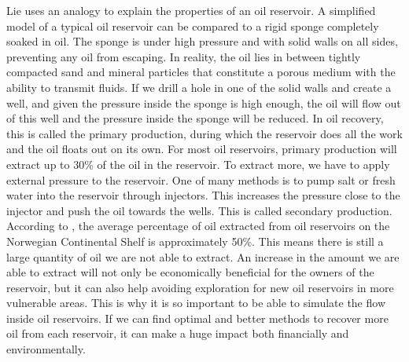 Lie uses an analogy to explain the properties of an oil reservoir. A simplified model of a typical oil reservoir can be compared to a rigid sponge completely soaked in oil. The sponge is under high pressure and with solid walls on all sides, preventing any oil from escaping. In reality, the oil lies in between tightly compacted sand and mineral particles that constitute a porous medium with the ability to transmit fluids. If we drill a hole in one of the solid walls and create a well, and given the pressure inside the sponge is high enough, the oil will flow out of this well and the pressure inside the sponge will be reduced. In oil recovery, this is called the primary production, during which the reservoir does all the work and the oil floats out on its own. For most oil reservoirs, primary production will extract up to 30\% of the oil in the reservoir. To extract more, we have to apply external pressure to the reservoir. One of many methods is to pump salt or fresh water into the reservoir through injectors. This increases the pressure close to the injector and push the oil towards the wells. This is called secondary production. According to \citep{lieMrstUrl}, the average percentage of oil extracted from oil reservoirs on the Norwegian Continental Shelf is approximately 50\%. This means there is still a large quantity of oil we are not able to extract. An increase in the amount we are able to extract will not only be economically beneficial for the owners of the reservoir, but it can also help avoiding exploration for new oil reservoirs in more vulnerable areas. This is why it is so important to be able to simulate the flow inside oil reservoirs. If we can find optimal and better methods to recover more oil from each reservoir, it can make a huge impact both financially and environmentally.

